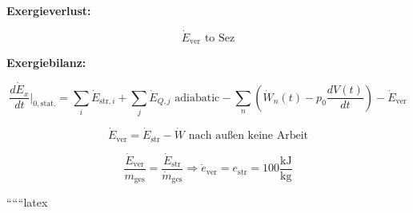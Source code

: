 \textbf{Exergieverlust:}

\[
\dot{E}_{\text{ver}} \text{ to } \text{Sez}
\]

\textbf{Exergiebilanz:}

\[
\frac{d\dot{E}_x}{dt} \bigg|_{0, \text{stat.}} = \sum_i \dot{E}_{\text{str}, i} + \sum_j \dot{E}_{Q, j} \text{ adiabatic} - \sum_n \left( \dot{W}_n(t) - p_0 \frac{dV(t)}{dt} \right) - \dot{E}_{\text{ver}}
\]

\[
\dot{E}_{\text{ver}} = \dot{E}_{\text{str}} - \dot{W} \text{ nach außen keine Arbeit}
\]

\[
\frac{\dot{E}_{\text{ver}}}{m_{\text{ges}}} = \frac{\dot{E}_{\text{str}}}{\dot{m}_{\text{ges}}} \Rightarrow \dot{e}_{\text{ver}} = e_{\text{str}} = 100 \frac{\text{kJ}}{\text{kg}}
\]

``````latex


